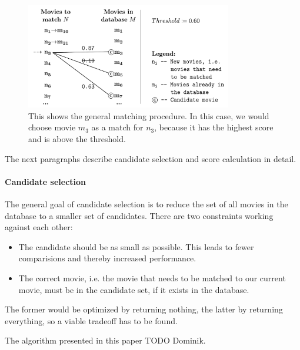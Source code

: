 \begin{figure}[ht]
  \begin{center}
  \includegraphics[width=0.8\textwidth]{images/matching_general.pdf}
  \end{center}
  \caption{This shows the general matching procedure. In this case, we would choose movie $m_3$ as a match for $n_3$, because it has the highest score and is above the threshold.}
  \label{fig_matching_general}
\end{figure}

The next paragraphs describe candidate selection and score calculation in detail.

\paragraph{Candidate selection}

The general goal of candidate selection is to reduce the set of all movies in the database to a smaller set of candidates.
There are two constraints working against each other:
\begin{itemize}
	\item The candidate should be as small as possible. This leads to fewer comparisions and thereby increased performance.
	\item The correct movie, i.e. the movie that needs to be matched to our current movie, must be in the candidate set, if it exists in the database.
\end{itemize}
The former would be optimized by returning nothing, the latter by returning everything, so a viable tradeoff has to be found.

The algorithm presented in this paper TODO Dominik.

